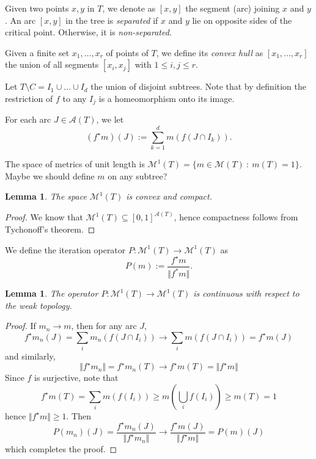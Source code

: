 \documentclass[11pt]{amsart}
\newtheorem{lemma}[theorem]{Lemma}
\begin{document}
Given two points $x, y$ in $T$, we denote as $[x, y]$ the segment (arc) joining $x$ and $y$. 
An arc $[x, y]$ in the tree is \emph{separated} if $x$ and $y$ lie on opposite sides of the critical point.  
Otherwise, it is \emph{non-separated}. 

Given a finite set $x_1, \dots, x_r$ of points of $T$, we define its \emph{convex hull} as $[x_1, \dots, x_r]$ the 
union of all segments $[x_i, x_j]$ with $1 \leq i, j \leq r$.

Let $T \setminus C = I_1 \cup \dots \cup I_d$ the union of disjoint subtrees. 
Note that by definition the restriction of $f$ to any $I_j$ is a homeomorphism onto its image.

For each arc $J \in \mathcal{A}(T)$, we let
$$(f^\star m)(J) := \sum_{k=1}^d m(f (J \cap I_k)).$$

The space of metrics of unit length is $\mathcal{M}^1(T) = \{ m \in \mathcal{M}(T) \ : \ m(T) = 1 \}$.
{\color{blue} Maybe we should define $m$ on any subtree?}

\begin{lemma} \label{L:compact}
The space $\mathcal{M}^1(T)$ is convex and compact. 
\end{lemma}

\begin{proof}
We know that $\mathcal{M}^1(T) \subseteq [0,1]^{\mathcal{A}(T)}$, hence compactness follows from Tychonoff's theorem.
\end{proof}


We define the iteration operator $P: \mathcal{M}^1(T) \to \mathcal{M}^1(T)$ as 
$$P(m) := \frac{f^\star m}{\Vert f^* m \Vert}.$$

\begin{lemma} \label{L:continuous}
The operator $P : \mathcal{M}^1(T) \to \mathcal{M}^1(T)$ is continuous with respect to the weak topology.
\end{lemma}

\begin{proof}
If $m_n \to m$, then for any arc $J$, 
$$f^\star m_n(J) = \sum_i m_n (f(J \cap I_i)) \to \sum_i m(f(J \cap I_i)) = f^\star m(J)$$
and similarly, 
$$\Vert f^\star m_n \Vert = f^\star m_n(T) \to  f^\star m(T) = \Vert f^\star m \Vert  $$
Since $f$ is surjective, note that 
$$f^\star m(T) = \sum_i m(f(I_i)) \geq m(\bigcup_i f(I_i)) \geq m(T) = 1$$
hence $\Vert f^\star m \Vert \geq 1$.
Then 
$$P(m_n)(J) = \frac{f^\star m_n(J)}{\Vert f^\star m_n \Vert} \to \frac{f^\star m(J)}{\Vert f^\star m \Vert} = P(m)(J)$$
which completes the proof.
\end{proof}
\end{document}

